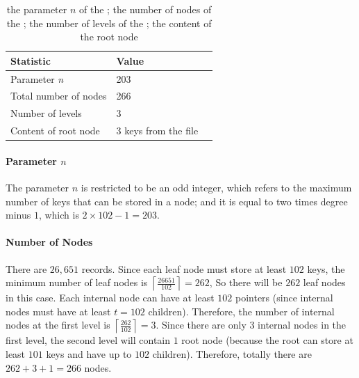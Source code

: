 \begin{table}[h]
    \hfill
    \begin{minipage}{.99\textwidth}
        \centering
        \renewcommand{\arraystretch}{1.2}
        \begin{tabular}{@{}lll@{}}
        \toprule
        Statistic                   & Value       \\
        \midrule
        \multirow{1}{*}{Parameter \textit{n}}& 203 \\

        \midrule
        \multirow{1}{*}{Total number of nodes} & 266  \\

        \midrule
        \multirow{1}{*}{Number of levels} & 3 \\

        \midrule
        \multirow{1}{*}{Content of root node} & 3 keys from the file \\

        \bottomrule
        \end{tabular}
        \vspace{5mm}
        \caption{the parameter $n$ of the \bplustree; the
number of nodes of the \bplustree; the number of levels of the \bplustree; the content of the root node}
    \end{minipage}
\end{table}

\paragraph{Parameter $n$} The parameter $n$ is restricted to be an odd integer, which refers to the maximum number of keys that can be stored in a node; and it is equal to two times degree minus $1$, which is $2\times 102-1=203$.

\paragraph{Number of Nodes} There are $26,651$ records. Since each leaf node must store at least $102$ keys, the minimum number of leaf nodes is $\left\lceil\frac{26651}{102}\right\rceil = 262$, So there will be $262$ leaf nodes in this case. Each internal node can have at least $102$ pointers (since internal nodes must have at least
$t=102$ children). Therefore, the number of internal nodes at the first level is $\left\lceil \frac{262}{102} \right\rceil = 3$. Since there are only $3$ internal nodes in the first level, the second level will contain $1$ root node (because the root can store at least $101$ keys and have up to $102$ children). Therefore, totally there are $262 + 3 + 1 = 266$ nodes.

